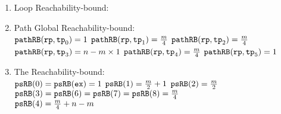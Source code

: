 \begin{enumerate}
    \item Loop Reachability-bound:
    \\
     \quad 
     \quad
    \item Path Global Reachability-bound:
    \\
    $\mathtt{pathRB}(\mathtt{rp}, \mathtt{tp}_0) = 1$ \quad
    $\mathtt{pathRB}(\mathtt{rp}, \mathtt{tp}_1) = \frac{m}{4}$ \quad
    $\mathtt{pathRB}(\mathtt{rp}, \mathtt{tp}_2) = \frac{m}{4}$ \\
    $\mathtt{pathRB}(\mathtt{rp}, \mathtt{tp}_3) = n - m \times 1$ \quad
    $\mathtt{pathRB}(\mathtt{rp}, \mathtt{tp}_4) = \frac{m}{4}$ \quad
    $\mathtt{pathRB}(\mathtt{rp}, \mathtt{tp}_5) = 1$
    \item The Reachability-bound:
    \\
    $\mathtt{psRB}(0) = \mathtt{psRB}(\mathtt{ex}) = 1$ \quad
    $\mathtt{psRB}(1) = \frac{m}{2} + 1$ \quad
    $\mathtt{psRB}(2) = \frac{m}{2} $ \\
    $\mathtt{psRB}(3) = \mathtt{psRB}(6) = \mathtt{psRB}(7)  = \mathtt{psRB}(8) = \frac{m}{4} $ \quad
     \\
    $\mathtt{psRB}(4) =  \frac{m}{4} + n - m$
  \end{enumerate}